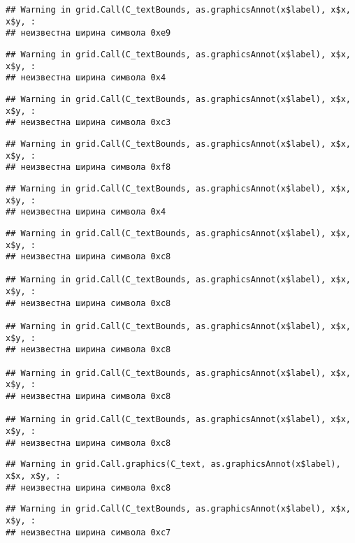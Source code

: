 \documentclass[
]{article}
\begin{document}
\begin{verbatim}
## Warning in grid.Call(C_textBounds, as.graphicsAnnot(x$label), x$x, x$y, :
## неизвестна ширина символа 0xe9
\end{verbatim}

\begin{verbatim}
## Warning in grid.Call(C_textBounds, as.graphicsAnnot(x$label), x$x, x$y, :
## неизвестна ширина символа 0x4
\end{verbatim}

\begin{verbatim}
## Warning in grid.Call(C_textBounds, as.graphicsAnnot(x$label), x$x, x$y, :
## неизвестна ширина символа 0xc3
\end{verbatim}

\begin{verbatim}
## Warning in grid.Call(C_textBounds, as.graphicsAnnot(x$label), x$x, x$y, :
## неизвестна ширина символа 0xf8
\end{verbatim}

\begin{verbatim}
## Warning in grid.Call(C_textBounds, as.graphicsAnnot(x$label), x$x, x$y, :
## неизвестна ширина символа 0x4
\end{verbatim}

\begin{verbatim}
## Warning in grid.Call(C_textBounds, as.graphicsAnnot(x$label), x$x, x$y, :
## неизвестна ширина символа 0xc8

## Warning in grid.Call(C_textBounds, as.graphicsAnnot(x$label), x$x, x$y, :
## неизвестна ширина символа 0xc8

## Warning in grid.Call(C_textBounds, as.graphicsAnnot(x$label), x$x, x$y, :
## неизвестна ширина символа 0xc8

## Warning in grid.Call(C_textBounds, as.graphicsAnnot(x$label), x$x, x$y, :
## неизвестна ширина символа 0xc8

## Warning in grid.Call(C_textBounds, as.graphicsAnnot(x$label), x$x, x$y, :
## неизвестна ширина символа 0xc8
\end{verbatim}

\begin{verbatim}
## Warning in grid.Call.graphics(C_text, as.graphicsAnnot(x$label), x$x, x$y, :
## неизвестна ширина символа 0xc8
\end{verbatim}

\begin{verbatim}
## Warning in grid.Call(C_textBounds, as.graphicsAnnot(x$label), x$x, x$y, :
## неизвестна ширина символа 0xc7
\end{verbatim}
\end{document}
